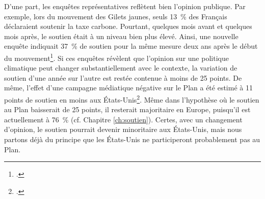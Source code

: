 \documentclass[a5paper,french,openany]{memoir}
\begin{document}
D'une part, les enquêtes représentatives reflètent bien %
l'opinion publique. 
Par exemple, lors du mouvement des Gilets jaunes, 
seuls 13~\% des Français déclaraient soutenir la taxe carbone. Pourtant, quelques mois avant et quelques mois après, le soutien était à un niveau bien plus élevé. Ainsi, une nouvelle enquête indiquait 37~\% de soutien pour la même mesure deux ans après le début du mouvement\footnote{\cite{douenne_les_2020}.}. Si ces enquêtes révèlent que l'opinion sur une politique climatique peut changer substantiellement avec le contexte, la variation de soutien d'une année sur l'autre est restée contenue à moins de 25 points. De même, l'effet d'une campagne médiatique négative sur le Plan a été estimé à 11 points de soutien en moins 
aux États-Unis\footnote{\cite{fabre_international_2023}.}. Même dans l'hypothèse où le soutien au Plan baisserait de 25 points, il resterait majoritaire en Europe, puisqu'il est actuellement à 76~\% (cf. Chapitre \ref{ch:soutien}). Certes, avec un changement d'opinion, le soutien pourrait devenir minoritaire aux États-Unis, mais nous partons déjà du principe que les États-Unis ne participeront probablement pas au Plan. 
\end{document}
